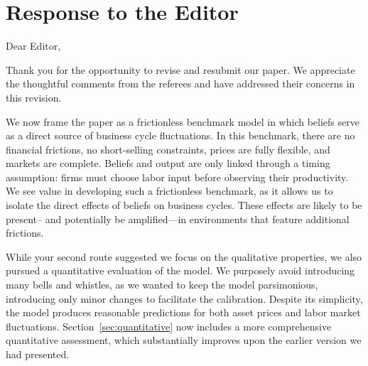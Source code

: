 \section*{Response to the Editor\bigskip{}
}

Dear Editor,\bigskip{}

Thank you for the opportunity to revise and resubmit our paper. We appreciate the thoughtful comments from the referees and have addressed their concerns in this revision.\medskip{}


We now frame the paper as a frictionless benchmark model in which beliefs serve as a direct source of business cycle fluctuations. 
In this benchmark, there are no financial frictions, no short-selling constraints, prices are fully flexible, and markets are complete. 
Beliefs and output are only linked through a timing assumption: firms must choose labor input before observing their productivity. 
We see value in developing such a frictionless benchmark, as it allows us to isolate the direct effects of beliefs on business cycles. 
These effects are likely to be present-- and potentially be amplified---in environments that feature additional frictions. \medskip{}

While your second route suggested we focus on the qualitative properties, we also pursued a quantitative evaluation of the model. 
We purposely avoid introducing many bells and whistles, as we wanted to keep the model parsimonious, introducing only minor changes to facilitate the calibration.
Despite its simplicity, the model produces reasonable predictions for both asset prices and labor market fluctuations. 
Section~\ref{sec:quantitative} now includes a more comprehensive quantitative assessment, which substantially improves upon the earlier version we had presented. \medskip{}
